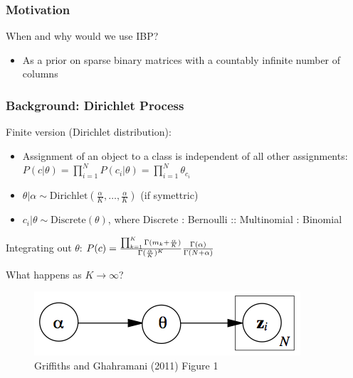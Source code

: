 \documentclass[13pt]{beamer}
\begin{document}
\begin{frame}
\frametitle{Motivation}

When and why would we use IBP?

\begin{itemize}
\item As a prior on sparse binary matrices with a countably infinite number of columns
\end{itemize}

\end{frame}
\begin{frame}
\frametitle{Background: Dirichlet Process}

Finite version (Dirichlet distribution):
\begin{itemize}
\item Assignment of an object to a class is independent of all other assignments: $P(c|\theta) = \prod_{i=1}^N P(c_i|\theta) = \prod_{i=1}^N \theta_{c_i}$
\item $\theta|\alpha \sim \text{Dirichlet}(\frac{\alpha}{K},\ldots,\frac{\alpha}{K})$ (if symettric)
\item $c_i|\theta \sim \text{Discrete}(\theta)$, where Discrete : Bernoulli :: Multinomial : Binomial
\end{itemize}

Integrating out $\theta$: $P(c) = { \prod_{k=1}^K \Gamma(m_k + \frac{\alpha}{K}) \over \Gamma(\frac{\alpha}{K})^K} {\Gamma(\alpha) \over \Gamma(N+\alpha)}$

What happens as $K \rightarrow \infty$?

\begin{figure}
\begin{center}
\includegraphics[scale=0.3]{./img/crp-graphical-model.png}
\caption{Griffiths and Ghahramani (2011) Figure 1}
\end{center}
\end{figure}

\end{frame}
\end{document}
